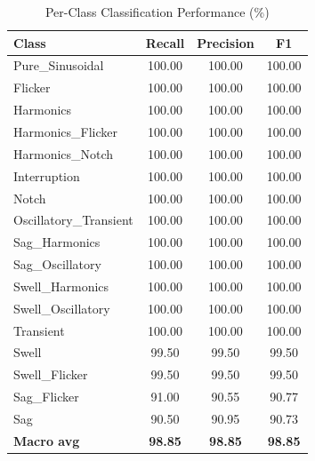 \documentclass[conference]{IEEEtran}
\begin{document}
\begin{table}[!htbp]
  \centering
  \caption{Per-Class Classification Performance (\%)}
  \label{tab:perclass}
  \footnotesize
  \setlength{\tabcolsep}{4pt}
  \renewcommand{\arraystretch}{1.15}
  \begin{tabular}{|l|c|c|c|}
    \hline
    Class & Recall & Precision & F1 \\
    \hline
    Pure\_Sinusoidal       & 100.00 & 100.00 & 100.00 \\
    \hline
    Flicker                & 100.00 & 100.00 & 100.00 \\
    \hline
    Harmonics              & 100.00 & 100.00 & 100.00 \\
    \hline
    Harmonics\_Flicker     & 100.00 & 100.00 & 100.00 \\
    \hline
    Harmonics\_Notch       & 100.00 & 100.00 & 100.00 \\
    \hline
    Interruption           & 100.00 & 100.00 & 100.00 \\
    \hline
    Notch                  & 100.00 & 100.00 & 100.00 \\
    \hline
    Oscillatory\_Transient & 100.00 & 100.00 & 100.00 \\
    \hline
    Sag\_Harmonics         & 100.00 & 100.00 & 100.00 \\
    \hline
    Sag\_Oscillatory       & 100.00 & 100.00 & 100.00 \\
    \hline
    Swell\_Harmonics       & 100.00 & 100.00 & 100.00 \\
    \hline
    Swell\_Oscillatory     & 100.00 & 100.00 & 100.00 \\
    \hline
    Transient              & 100.00 & 100.00 & 100.00 \\
    \hline
    Swell                  & 99.50  & 99.50  & 99.50  \\
    \hline
    Swell\_Flicker         & 99.50  & 99.50  & 99.50  \\
    \hline
    Sag\_Flicker           & 91.00  & 90.55  & 90.77  \\
    \hline
    Sag                    & 90.50  & 90.95  & 90.73  \\
    \hline
    \textbf{Macro avg}     & \textbf{98.85} & \textbf{98.85} & \textbf{98.85} \\
    \hline
  \end{tabular}
\end{table}
\end{document}

